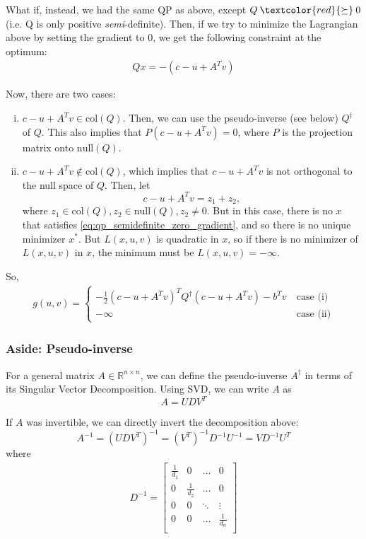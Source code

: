 \documentclass[twoside]{article}
\newcommand{\R}{\mathbb{R}}
\begin{document}
What if, instead, we had the same QP as above, except $Q
\mathbin{\textcolor{red}{\succeq}} 0$ (i.e. Q is only positive
\textit{semi}-definite).  Then, if we try to minimize the Lagrangian above by
setting the gradient to 0, we get the following constraint at the optimum:
\begin{align}
Qx = -(c - u + A^T v) \label{eq:qp_semidefinite_zero_gradient}
\end{align}

Now, there are two cases:
\begin{enumerate}[(i)]
\item $c - u + A^T v \in \text{col}(Q)$. Then, we can use the pseudo-inverse (see below)
      $Q^{\dagger}$ of $Q$. This also implies that $P \left( c - u + A^T v \right) = 0$, where $P$ is the projection matrix onto $\text{null}\left(Q\right)$.
\item $c - u + A^T v \not\in \text{col}(Q)$, which implies that $c - u + A^T v$
      is not orthogonal to the null space of $Q$. Then, let
      \[ c - u + A^T v = z_1 + z_2, \]
      where $z_1 \in \text{col}(Q), z_2 \in \text{null}(Q), z_2 \neq 0$. But
      in this case, there is no $x$ that satisfies
      \cref{eq:qp_semidefinite_zero_gradient}, and so there is no unique
      minimizer $x^*$. But $L(x, u, v)$ is quadratic in $x$, so if there is no
      minimizer of $L(x, u, v)$ in $x$, the minimum must be $L(x, u, v) =
      -\infty$.
\end{enumerate}

So,
\begin{align*}
g(u, v) = \begin{cases}
-\frac{1}{2} (c - u + A^T v)^T Q^{\dagger} (c - u + A^Tv) - b^T v ~&\text{case (i)} \\
-\infty ~&\text{case (ii)}
\end{cases}
\end{align*}

\subsubsection{Aside: Pseudo-inverse}
For a general matrix $A \in \R^{n\times n}$, we can define the pseudo-inverse
$A^{\dagger}$ in terms of its Singular Vector Decomposition. Using SVD, we can
write $A$ as
\[ A = U D V^T \]

If $A$ was invertible, we can directly invert the decomposition above:
\[ A^{-1} = (U D V^T)^{-1} = (V^T)^{-1} D^{-1} U^{-1} = V D^{-1} U^T \]
where
\begin{align*}
D^{-1} = \begin{bmatrix}
\frac{1}{d_1} & 0 & \dots & 0 \\
0 & \frac{1}{d_2} & \dots & 0 \\
0 & 0 & \ddots & \vdots \\
0 & 0 & \dots & \frac{1}{d_n} \\
\end{bmatrix}
\end{align*}
\end{document}
